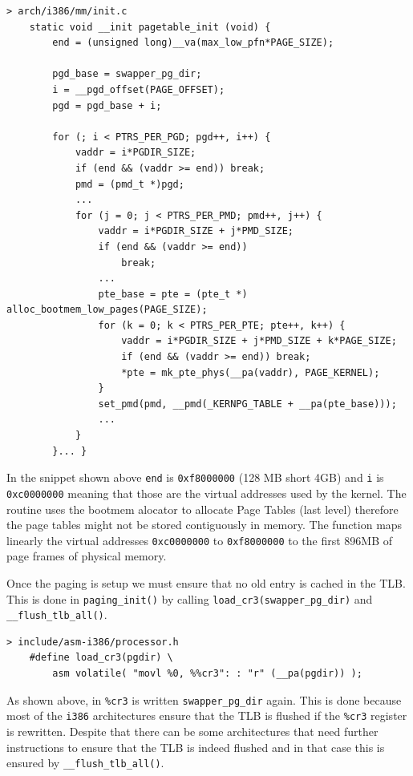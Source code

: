 \documentclass[twoside]{article}
\begin{document}
\begin{verbatim}
> arch/i386/mm/init.c
    static void __init pagetable_init (void) {
        end = (unsigned long)__va(max_low_pfn*PAGE_SIZE);

        pgd_base = swapper_pg_dir;
        i = __pgd_offset(PAGE_OFFSET);
        pgd = pgd_base + i;

        for (; i < PTRS_PER_PGD; pgd++, i++) {
            vaddr = i*PGDIR_SIZE;
            if (end && (vaddr >= end)) break;
            pmd = (pmd_t *)pgd;
            ... 
            for (j = 0; j < PTRS_PER_PMD; pmd++, j++) {
                vaddr = i*PGDIR_SIZE + j*PMD_SIZE;
                if (end && (vaddr >= end))
                    break;
                ...
                pte_base = pte = (pte_t *) alloc_bootmem_low_pages(PAGE_SIZE);
                for (k = 0; k < PTRS_PER_PTE; pte++, k++) {
                    vaddr = i*PGDIR_SIZE + j*PMD_SIZE + k*PAGE_SIZE;
                    if (end && (vaddr >= end)) break;
                    *pte = mk_pte_phys(__pa(vaddr), PAGE_KERNEL);
                }
                set_pmd(pmd, __pmd(_KERNPG_TABLE + __pa(pte_base)));
                ...
            }
        }... }
\end{verbatim}

In the snippet shown above \texttt{end} is \texttt{0xf8000000} (128 MB short 4GB) and \texttt{i} is \texttt{0xc0000000} meaning that those are the virtual addresses used by the kernel. The routine uses the bootmem alocator to allocate Page Tables (last level) therefore the page tables might not be stored contiguously in memory. The function maps linearly the virtual addresses \texttt{0xc0000000} to \texttt{0xf8000000} to the first 896MB of page frames of physical memory.

Once the paging is setup we must ensure that no old entry is cached in the
TLB. This is done in \texttt{paging_init()} by calling 
\texttt{load_cr3(swapper_pg_dir)} and \texttt{__flush_tlb_all()}.

\begin{verbatim}
> include/asm-i386/processor.h
    #define load_cr3(pgdir) \
        asm volatile( "movl %0, %%cr3": : "r" (__pa(pgdir)) );
\end{verbatim}

As shown above, in \texttt{\%cr3} is written \texttt{swapper_pg_dir} again.
This is done because most of the \texttt{i386} architectures ensure that
the TLB is flushed if the \texttt{\%cr3} register is rewritten. Despite that
there can be some architectures that need further instructions to ensure that
the TLB is indeed flushed and in that case this is ensured by
\texttt{__flush_tlb_all()}.
\end{document}
